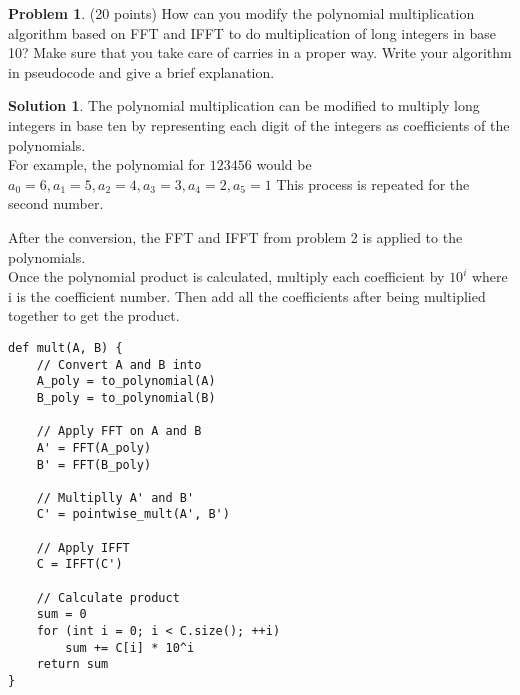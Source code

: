 \documentclass{article}
\theoremstyle{definition}
\newtheorem{problem}{Problem}
\newtheorem*{solution}{Solution}
\begin{document}
\clearpage
\begin{problem} (20 points) 
How can you modify the polynomial multiplication algorithm based
  on FFT and IFFT to do multiplication of long integers in base 10?
  Make sure that you take care of carries in a proper way. Write your
  algorithm in pseudocode and give a brief explanation. 
\end{problem}
\begin{solution}
The polynomial multiplication can be modified to multiply long integers in base ten by representing each digit of the integers as coefficients of the polynomials.\\
For example, the polynomial for $123456$ would be $a_0=6,a_1=5,a_2=4,a_3=3,a_4=2,a_5=1$ This process is repeated for the second number.

\noindent
After the conversion, the FFT and IFFT from problem 2 is applied to the polynomials.\\
Once the polynomial product is calculated, multiply each coefficient by $10^i$ where i is the coefficient number. Then add all the coefficients after being multiplied together to get the product.

\begin{verbatim}
def mult(A, B) {
    // Convert A and B into 
    A_poly = to_polynomial(A)
    B_poly = to_polynomial(B)

    // Apply FFT on A and B
    A' = FFT(A_poly)
    B' = FFT(B_poly)

    // Multiplly A' and B'
    C' = pointwise_mult(A', B')

    // Apply IFFT
    C = IFFT(C')

    // Calculate product
    sum = 0
    for (int i = 0; i < C.size(); ++i)
        sum += C[i] * 10^i
    return sum
}
\end{verbatim}
\end{solution}
\end{document}
